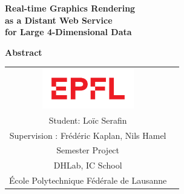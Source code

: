 \documentclass[a4paper,11pt]{book}
\begin{document}
    \begin{titlepage}
        \begin{otherlanguage}{french}
            \begin{center}

                \null\vspace{2cm}
                {\Huge\textbf{
                    Real-time Graphics Rendering \\[4pt]
                    as a Distant Web Service \\[12pt]
                    for Large 4-Dimensional Data
                }}
                \vspace{2cm}

                \textbf{Abstract}
                {\justify
                \lipsum[1] %
                }
                \vfill

                \begin{tabular} {cc}
                    \includegraphics[width=4cm]{images/epfl}\\

                    Student: Loïc Serafin\\
                    Supervision : Frédéric Kaplan, Nils Hamel\\[10pt]

                    Semester Project\\
                    DHLab, IC School\\
                    École Polytechnique Fédérale de Lausanne
                \end{tabular}

            \end{center}
            \vspace{2cm}
        \end{otherlanguage}
    \end{titlepage}

    \tableofcontents

    
    
    
    
    

    \begin{appendices}
    
    
\end{appendices}
\end{document}
